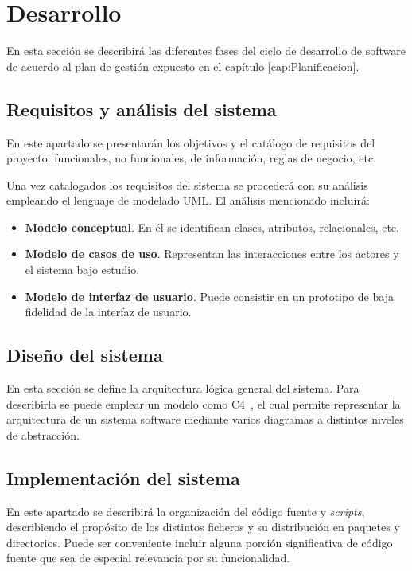 \chapter{Desarrollo}
\label{cap:Desarrollo}

En esta sección se describirá las diferentes fases del ciclo de desarrollo de software de acuerdo al plan de gestión expuesto en el capítulo \ref{cap:Planificacion}. 

\section{Requisitos y análisis del sistema}
En este apartado se presentarán los objetivos y el catálogo de requisitos del proyecto: funcionales, no funcionales, de información, reglas de negocio, etc.

Una vez catalogados los requisitos del sistema se procederá con su análisis empleando el lenguaje de modelado UML. El análisis mencionado incluirá:
\begin{itemize}
\item \textbf{Modelo conceptual}. En él se identifican clases, atributos, relacionales, etc.

\item \textbf{Modelo de casos de uso}. Representan las interacciones entre los actores y el sistema bajo estudio.

\item \textbf{Modelo de interfaz de usuario}. Puede consistir en un prototipo de baja fidelidad de la interfaz de usuario.
\end{itemize}

\section{Diseño del sistema}
En esta sección se define la arquitectura lógica general del sistema. Para describirla se puede emplear un modelo como C4~\cite{Brown22}, el cual permite representar la arquitectura de un sistema software mediante varios diagramas a distintos niveles de abstracción.

\section{Implementación del sistema}
En este apartado se describirá la organización del código fuente y \emph{scripts}, describiendo el propósito de los distintos ficheros y su distribución en paquetes y directorios. Puede ser conveniente incluir alguna porción significativa de código fuente que sea de especial relevancia por su funcionalidad.

